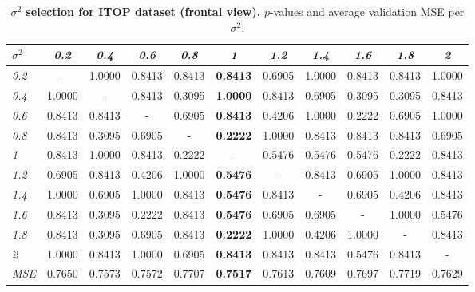 \documentclass[review,12pt,3p]{elsarticle}
\begin{document}
\begin{table}[t]
\caption{\textbf{$\sigma^2$ selection for ITOP dataset (frontal view).} $p$-values and average validation MSE per $\sigma^2$.}
\label{tab:statsS2iTOPfview}
\scriptsize %
\begin{center}
\setlength{\tabcolsep}{0.2em} %
\begin{tabular}{|l|c c c c c c c c c c |}
\hline
 $\sigma^2$ & \emph{0.2} & \emph{0.4}& \emph{0.6}& \emph{0.8}& \emph{1}& \emph{1.2}& \emph{1.4}& \emph{1.6}& \emph{1.8}& \emph{2} \\
\hline \emph{0.2} & - & 1.0000 & 0.8413 & 0.8413 & \textbf{0.8413} & 0.6905 & 1.0000 & 0.8413 & 0.8413 & 1.0000  \\
  \hline \emph{0.4} & 1.0000 & - & 0.8413 & 0.3095 & \textbf{1.0000} & 0.8413 & 0.6905 & 0.3095 & 0.3095 & 0.8413  \\
  \hline \emph{0.6} & 0.8413 & 0.8413 & - & 0.6905 & \textbf{0.8413} & 0.4206 & 1.0000 & 0.2222 & 0.6905 & 1.0000  \\
  \hline \emph{0.8} & 0.8413 & 0.3095 & 0.6905 & - & \textbf{0.2222} & 1.0000 & 0.8413 & 0.8413 & 0.8413 & 0.6905  \\
  \hline \emph{1} & 0.8413 & 1.0000 & 0.8413 & 0.2222 & - & 0.5476 & 0.5476 & 0.5476 & 0.2222 & 0.8413  \\
  \hline \emph{1.2} & 0.6905 & 0.8413 & 0.4206 & 1.0000 & \textbf{0.5476} & - & 0.8413 & 0.6905 & 1.0000 & 0.8413  \\
  \hline \emph{1.4} & 1.0000 & 0.6905 & 1.0000 & 0.8413 & \textbf{0.5476} & 0.8413 & - & 0.6905 & 0.4206 & 0.8413  \\
  \hline \emph{1.6} & 0.8413 & 0.3095 & 0.2222 & 0.8413 & \textbf{0.5476} & 0.6905 & 0.6905 & - & 1.0000 & 0.5476  \\
  \hline \emph{1.8} & 0.8413 & 0.3095 & 0.6905 & 0.8413 & \textbf{0.2222} & 1.0000 & 0.4206 & 1.0000 & - & 0.8413  \\
  \hline \emph{2} & 1.0000 & 0.8413 & 1.0000 & 0.6905 & \textbf{0.8413} & 0.8413 & 0.8413 & 0.5476 & 0.8413 & -  \\

\hline 
\hline
\textit{MSE} & 0.7650  &  0.7573  &  0.7572&    0.7707&    \textbf{0.7517}&    0.7613&    0.7609&    0.7697  &  0.7719 &   0.7629\\
\hline
\end{tabular} 
\end{center}
\end{table}
\end{document}

